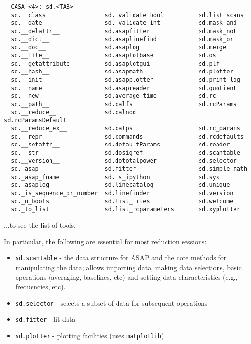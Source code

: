\small
\begin{verbatim}
  CASA <4>: sd.<TAB>
  sd.__class__               sd._validate_bool          sd.list_scans
  sd.__date__                sd._validate_int           sd.mask_and
  sd.__delattr__             sd.asapfitter              sd.mask_not
  sd.__dict__                sd.asaplinefind            sd.mask_or
  sd.__doc__                 sd.asaplog                 sd.merge
  sd.__file__                sd.asaplotbase             sd.os
  sd.__getattribute__        sd.asaplotgui              sd.plf
  sd.__hash__                sd.asapmath                sd.plotter
  sd.__init__                sd.asapplotter             sd.print_log
  sd.__name__                sd.asapreader              sd.quotient
  sd.__new__                 sd.average_time            sd.rc
  sd.__path__                sd.calfs                   sd.rcParams
  sd.__reduce__              sd.calnod                  sd.rcParamsDefault
  sd.__reduce_ex__           sd.calps                   sd.rc_params
  sd.__repr__                sd.commands                sd.rcdefaults
  sd.__setattr__             sd.defaultParams           sd.reader
  sd.__str__                 sd.dosigref                sd.scantable
  sd.__version__             sd.dototalpower            sd.selector
  sd._asap                   sd.fitter                  sd.simple_math
  sd._asap_fname             sd.is_ipython              sd.sys
  sd._asaplog                sd.linecatalog             sd.unique
  sd._is_sequence_or_number  sd.linefinder              sd.version
  sd._n_bools                sd.list_files              sd.welcome
  sd._to_list                sd.list_rcparameters       sd.xyplotter
\end{verbatim}
\normalsize

...to see the list of tools.

In particular, the following are essential for most reduction
sessions: 
\begin{itemize}
   \item {\tt sd.scantable} - the data structure for ASAP and the core
         methods for manipulating the data; allows importing data,
         making data selections, basic operations (averaging,
         baselines, etc) and setting data characteristics (e.g.,
         frequencies, etc).
   \item {\tt sd.selector} - selects a subset of data for subsequent operations
   \item {\tt sd.fitter} - fit data 
   \item {\tt sd.plotter} - plotting facilities (uses {\tt matplotlib})
\end{itemize}

